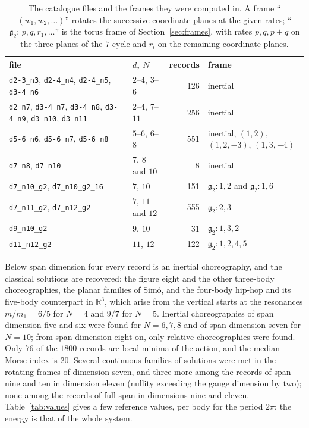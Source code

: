 \documentclass[11pt]{amsart}
\theoremstyle{definition}
\newcommand{\R}{\mathbb{R}}
\begin{document}
\begin{table}[ht]
\caption{The catalogue files and the frames they were computed in. A frame ``$(w_1,w_2,\dots)$'' rotates the successive coordinate planes at the given rates; ``$\mathfrak g_2{:}\,p,q,r_1,\dots$'' is the torus frame of Section~\ref{sec:frames}, with rates $p,q,p{+}q$ on the three planes of the $7$-cycle and $r_i$ on the remaining coordinate planes.}\label{tab:files}
\centering\footnotesize\setlength{\tabcolsep}{4pt}
\begin{tabular}{@{}llrl@{}}
\toprule
file & $d$, $N$ & records & frame\\
\midrule
\texttt{d2-3\_n3}, \texttt{d2-4\_n4}, \texttt{d2-4\_n5}, \texttt{d3-4\_n6} & $2$--$4$, $3$--$6$ & 126 & inertial\\
\texttt{d2\_n7}, \texttt{d3-4\_n7}, \texttt{d3-4\_n8}, \texttt{d3-4\_n9}, \texttt{d3\_n10}, \texttt{d3\_n11} & $2$--$4$, $7$--$11$ & 256 & inertial\\
\texttt{d5-6\_n6}, \texttt{d5-6\_n7}, \texttt{d5-6\_n8} & $5$--$6$, $6$--$8$ & 551 & inertial, $(1,2)$, $(1,2,-3)$, $(1,3,-4)$\\
\texttt{d7\_n8}, \texttt{d7\_n10} & $7$, $8$ and $10$ & 8 & inertial\\
\texttt{d7\_n10\_g2}, \texttt{d7\_n10\_g2\_16} & $7$, $10$ & 151 & $\mathfrak g_2{:}1,2$ and $\mathfrak g_2{:}1,6$\\
\texttt{d7\_n11\_g2}, \texttt{d7\_n12\_g2} & $7$, $11$ and $12$ & 555 & $\mathfrak g_2{:}2,3$\\
\texttt{d9\_n10\_g2} & $9$, $10$ & 31 & $\mathfrak g_2{:}1,3,2$\\
\texttt{d11\_n12\_g2} & $11$, $12$ & 122 & $\mathfrak g_2{:}1,2,4,5$\\
\bottomrule
\end{tabular}
\end{table}

Below span dimension four every record is an inertial choreography, and the classical solutions are recovered: the figure eight and the other three-body choreographies, the planar families of Sim\'o, and the four-body hip-hop and its five-body counterpart in $\R^3$, which arise from the vertical starts at the resonances $m/m_1=6/5$ for $N=4$ and $9/7$ for $N=5$. Inertial choreographies of span dimension five and six were found for $N=6,7,8$ and of span dimension seven for $N=10$; from span dimension eight on, only relative choreographies were found. Only $76$ of the $1800$ records are local minima of the action, and the median Morse index is $20$. Several continuous families of solutions were met in the rotating frames of dimension seven, and three more among the records of span nine and ten in dimension eleven (nullity exceeding the gauge dimension by two); none among the records of full span in dimensions nine and eleven. Table~\ref{tab:values} gives a few reference values, per body for the period $2\pi$; the energy is that of the whole system.
\end{document}
